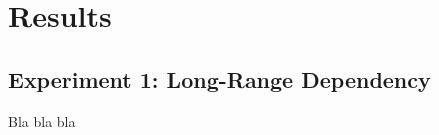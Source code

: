 \section{Results}\label{ch:results}

\subsection{Experiment 1: Long-Range Dependency}\label{resultsLRD}
Bla bla bla





